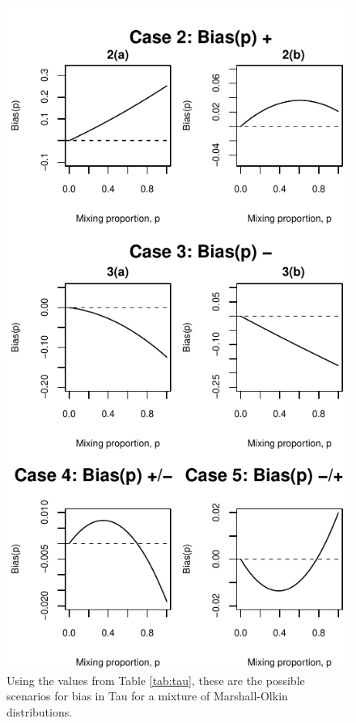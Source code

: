 \begin{figure}
    \centering
    \includegraphics{images/tau_MO_graphs.pdf}
    \caption{Using the values from Table \ref{tab:tau}, these are the possible scenarios for bias in Tau for a mixture of Marshall-Olkin distributions.}
    \label{fig:tauCases}
\end{figure}
